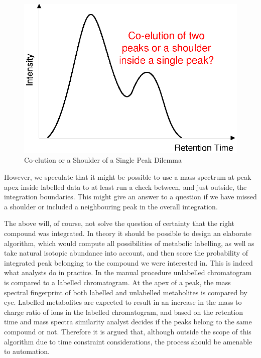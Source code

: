 \begin{figure}
  \begin{center}
    \includegraphics[scale=0.7]{graphics/chapter08/90.eps}
  \end{center}
  \caption{Co-elution or a Shoulder of a Single Peak Dilemma}
  \label{fig:90}
\end{figure}

However, we speculate that it might be possible to use a mass spectrum at peak 
apex inside labelled data to at least run a check between, and just outside, 
the integration boundaries. This might give an answer to a question if we have 
missed a shoulder or included a neighbouring peak in the overall integration. 

The above will, of course, not solve the question of certainty that the right 
compound was integrated. In theory it should be possible to design an elaborate 
algorithm, which would compute all possibilities of metabolic labelling, as 
well as take natural isotopic abundance into account, and then score the 
probability of integrated peak belonging to the compound we were interested in. 
This is indeed what analysts do in practice. In the manual procedure unlabelled 
chromatogram is compared to a labelled chromatogram. At the apex of a peak, the 
mass spectral fingerprint of both labelled and unlabelled metabolites is 
compared by eye. Labelled metabolites are expected to result in an increase in 
the mass to charge ratio of ions in the labelled chromatogram, and based on the 
retention time and mass spectra similarity analyst decides if the peaks belong 
to the same compound or not. Therefore it is argued that, although outside the 
scope of this algorithm due to time constraint considerations, the process 
should be amenable to automation. 

